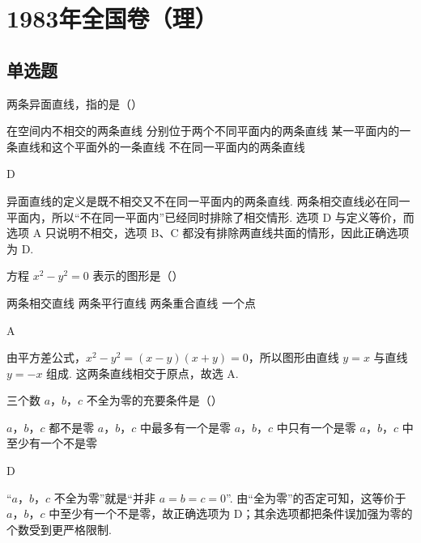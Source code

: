 \chapter{1983年全国卷（理）}

\section{单选题}

\begin{problem}
两条异面直线，指的是（\quad）

\choices
    {在空间内不相交的两条直线}
    {分别位于两个不同平面内的两条直线}
    {某一平面内的一条直线和这个平面外的一条直线}
    {不在同一平面内的两条直线}

\begin{answer}
D
\end{answer}

\begin{solution}
异面直线的定义是既不相交又不在同一平面内的两条直线. 两条相交直线必在同一平面内，所以“不在同一平面内”已经同时排除了相交情形. 选项 D 与定义等价，而选项 A 只说明不相交，选项 B、C 都没有排除两直线共面的情形，因此正确选项为 D.
\end{solution}
\end{problem}

\begin{problem}
方程 \(x^{2} - y^{2} = 0\) 表示的图形是（\quad）

\choices
    {两条相交直线}
    {两条平行直线}
    {两条重合直线}
    {一个点}

\begin{answer}
A
\end{answer}

\begin{solution}
由平方差公式，\(x^{2}-y^{2}=(x-y)(x+y)=0\)，所以图形由直线 \(y=x\) 与直线 \(y=-x\) 组成. 这两条直线相交于原点，故选 A.
\end{solution}
\end{problem}

\begin{problem}
三个数 \(a\)，\(b\)，\(c\) 不全为零的充要条件是（\quad）

\choices
    {\(a\)，\(b\)，\(c\) 都不是零}
    {\(a\)，\(b\)，\(c\) 中最多有一个是零}
    {\(a\)，\(b\)，\(c\) 中只有一个是零}
    {\(a\)，\(b\)，\(c\) 中至少有一个不是零}

\begin{answer}
D
\end{answer}

\begin{solution}
“\(a\)，\(b\)，\(c\) 不全为零”就是“并非 \(a=b=c=0\)”. 由“全为零”的否定可知，这等价于 \(a\)，\(b\)，\(c\) 中至少有一个不是零，故正确选项为 D；其余选项都把条件误加强为零的个数受到更严格限制.
\end{solution}
\end{problem}


